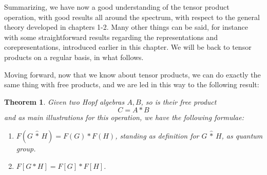 \documentclass[12pt]{amsbook}
\newtheorem{theorem}{Theorem}[chapter]
\begin{document}
Summarizing, we have now a good understanding of the tensor product operation, with good results all around the spectrum, with respect to the general theory developed in chapters 1-2. Many other things can be said, for instance with some straightforward results regarding the representations and corepresentations, introduced earlier in this chapter. We will be back to tensor products on a regular basis, in what follows.

\bigskip

Moving forward, now that we know about tensor products, we can do exactly the same thing with free products, and we are led in this way to the following result:


\begin{theorem}
Given two Hopf algebras $A,B$, so is their free product 
$$C=A*B$$
and as main illustrations for this operation, we have the following formulae:
\begin{enumerate}
\item $F(G\,\hat{*}\,H)=F(G)*F(H)$, standing as definition for $G\,\hat{*}\,H$, as quantum group.

\item $F[G*H]=F[G]*F[H]$.
\end{enumerate}
\end{theorem}
\end{document}
